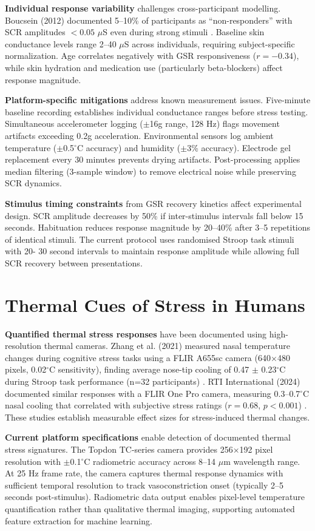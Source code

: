 \textbf{Individual response variability} challenges cross-participant modelling. Boucsein (2012) documented 5--10\% of participants as ``non-responders'' with SCR amplitudes $<0.05$ $\mu$S even during strong stimuli \cite{ref1}. Baseline skin conductance levels range 2--40 $\mu$S across individuals, requiring subject-specific normalization. Age correlates negatively with GSR responsiveness ($r = -0.34$), while skin hydration and medication use (particularly beta-blockers) affect response magnitude.

\textbf{Platform-specific mitigations} address known measurement issues. Five-minute baseline recording establishes individual conductance ranges before stress testing. Simultaneous accelerometer logging ($\pm$16g range, 128 Hz) flags movement artifacts exceeding 0.2g acceleration. Environmental sensors log ambient temperature ($\pm$0.5$^\circ$C accuracy) and humidity ($\pm$3\% accuracy). Electrode gel replacement every 30 minutes prevents drying artifacts. Post-processing applies median filtering (3-sample window) to remove electrical noise while preserving SCR dynamics.

\textbf{Stimulus timing constraints} from GSR recovery kinetics affect experimental design. SCR amplitude decreases by 50\% if inter-stimulus intervals fall below 15 seconds. Habituation reduces response magnitude by 20--40\% after 3--5 repetitions of identical stimuli. The current protocol uses randomised Stroop task stimuli with 20- 30 second intervals to maintain response amplitude while allowing full SCR recovery between presentations.

\section{Thermal Cues of Stress in Humans}
\textbf{Quantified thermal stress responses} have been documented using high-resolution thermal cameras. Zhang et al. (2021) measured nasal temperature changes during cognitive stress tasks using a FLIR A655sc camera (640$\times$480 pixels, 0.02$^\circ$C sensitivity), finding average nose-tip cooling of 0.47 $\pm$ 0.23$^\circ$C during Stroop task performance (n=32 participants) \cite{ref5}. RTI International (2024) documented similar responses with a FLIR One Pro camera, measuring 0.3--0.7$^\circ$C nasal cooling that correlated with subjective stress ratings ($r = 0.68$, $p < 0.001$) \cite{ref6}. These studies establish measurable effect sizes for stress-induced thermal changes.

\textbf{Current platform specifications} enable detection of documented thermal stress signatures. The Topdon TC-series camera provides 256$\times$192 pixel resolution with $\pm$0.1$^\circ$C radiometric accuracy across 8--14 $\mu$m wavelength range. At 25 Hz frame rate, the camera captures thermal response dynamics with sufficient temporal resolution to track vasoconstriction onset (typically 2--5 seconds post-stimulus). Radiometric data output enables pixel-level temperature quantification rather than qualitative thermal imaging, supporting automated feature extraction for machine learning.

